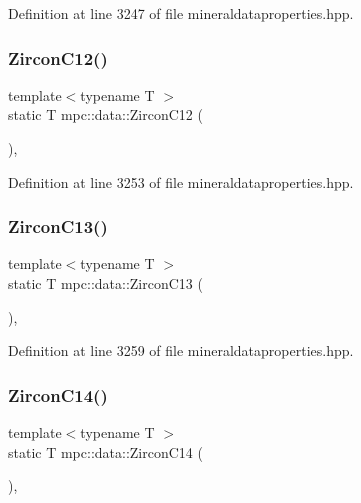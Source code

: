 Definition at line 3247 of file mineraldataproperties.\+hpp.

\mbox{\label{namespacempc_1_1data_af6fbaef32aa553dab4e52f35a5ecf88d}} 
\subsubsection{\texorpdfstring{Zircon\+C12()}{ZirconC12()}}
{\footnotesize\ttfamily template$<$typename T $>$ \\
static T mpc\+::data\+::\+Zircon\+C12 (\begin{DoxyParamCaption}{ }\end{DoxyParamCaption})\hspace{0.3cm}{\ttfamily [inline]}, {\ttfamily [static]}}



Definition at line 3253 of file mineraldataproperties.\+hpp.

\mbox{\label{namespacempc_1_1data_a86a9861b805ec348a9c7a4c3cf1b25e8}} 
\subsubsection{\texorpdfstring{Zircon\+C13()}{ZirconC13()}}
{\footnotesize\ttfamily template$<$typename T $>$ \\
static T mpc\+::data\+::\+Zircon\+C13 (\begin{DoxyParamCaption}{ }\end{DoxyParamCaption})\hspace{0.3cm}{\ttfamily [inline]}, {\ttfamily [static]}}



Definition at line 3259 of file mineraldataproperties.\+hpp.

\mbox{\label{namespacempc_1_1data_ad928eb73775dbcd33260088332afb227}} 
\subsubsection{\texorpdfstring{Zircon\+C14()}{ZirconC14()}}
{\footnotesize\ttfamily template$<$typename T $>$ \\
static T mpc\+::data\+::\+Zircon\+C14 (\begin{DoxyParamCaption}{ }\end{DoxyParamCaption})\hspace{0.3cm}{\ttfamily [inline]}, {\ttfamily [static]}}



